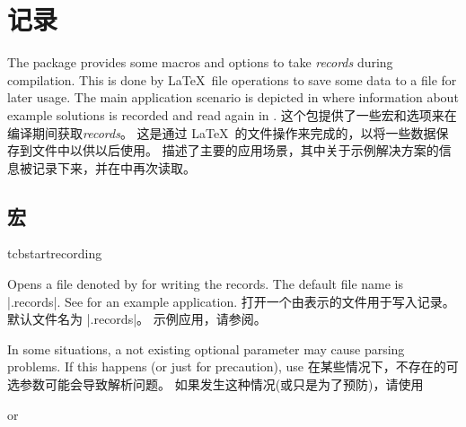 \section{记录}\label{sec:recording}%
%
\begin{stripedbox}
The package provides some macros and options to take \emph{records} during compilation. 
This is done by \LaTeX\ file operations to save some data to a file for later usage. 
The main application scenario is depicted in  where information about example solutions is recorded and read again in .
\tcblower
这个包提供了一些宏和选项来在编译期间获取\emph{records}。%
这是通过 \LaTeX\ 的文件操作来完成的，以将一些数据保存到文件中以供以后使用。%
描述了主要的应用场景，其中关于示例解决方案的信息被记录下来，并在中再次读取。
\end{stripedbox}

\subsection{宏}\label{sec:recording-makros}
\begin{docCommand}[doc new=2014-11-28]{tcbstartrecording}{}
\begin{stripedbox}
Opens a file denoted by  for writing the records.
The default file name is |\jobname.records|.
See  for an example application.
\tcblower
打开一个由表示的文件用于写入记录。%
默认文件名为 |\jobname.records|。%
示例应用，请参阅。
\end{stripedbox}

  \begin{marker}
\begin{stripedbox}
In some situations, a not existing optional parameter may cause parsing problems. 
If this happens (or just for precaution), use
\tcblower
在某些情况下，不存在的可选参数可能会导致解析问题。%
如果发生这种情况(或只是为了预防)，请使用
\end{stripedbox}

\begin{dispListing}
\tcbstartrecording\relax
\end{dispListing}
  or
\begin{dispListing}
\end{dispListing}
  \end{marker}
\end{docCommand}

